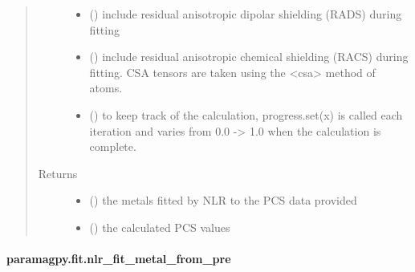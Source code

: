 \documentclass[a4paper,10pt,english,openany,oneside]{sphinxmanual}
\begin{document}
\begin{fulllineitems}
\begin{quote}
\begin{description}
\begin{itemize}
\item {} 
 (\sphinxstyleliteralemphasis{\sphinxupquote{, }}) \textendash{} include residual anisotropic dipolar shielding (RADS) during fitting

\item {} 
 (\sphinxstyleliteralemphasis{\sphinxupquote{, }}) \textendash{} include residual anisotropic chemical shielding (RACS) during fitting.
CSA tensors are taken using the \textless{}csa\textgreater{} method of atoms.

\item {} 
 (\sphinxstyleliteralemphasis{\sphinxupquote{, }}) \textendash{} to keep track of the calculation, progress.set(x) is called each
iteration and varies from 0.0 -\textgreater{} 1.0 when the calculation is complete.

\end{itemize}

\item[{Returns}] \leavevmode
\begin{itemize}
\item {} 
 () \textendash{} the metals fitted by NLR to the PCS data provided

\item {} 
 () \textendash{} the calculated PCS values

\end{itemize}


\end{description}\end{quote}

\end{fulllineitems}



\paragraph{paramagpy.fit.nlr\_fit\_metal\_from\_pre}
\label{\detokenize{reference/generated/paramagpy.fit.nlr_fit_metal_from_pre:paramagpy-fit-nlr-fit-metal-from-pre}}\label{\detokenize{reference/generated/paramagpy.fit.nlr_fit_metal_from_pre::doc}}
\end{document}
